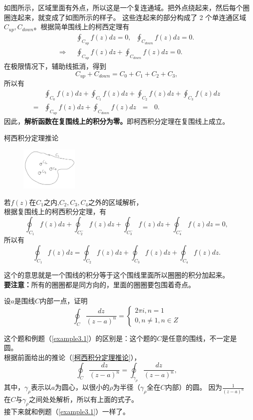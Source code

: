 \documentclass[cn,hazy,blue,14pt,normal]{elegantnote}
\numberwithin{equation}{section}
\begin{document}
如图所示，区域里面有外点，所以这是一个复连通域。把外点绕起来，然后每个圈圈连起来，就变成了如图所示的样子。
这些连起来的部分构成了 2 个单连通区域 $C_{up}, C_{down}$。根据简单围线上的柯西定理有
\begin{align*}
&\oint_{C_{up}} f(z) dz = 0, ~~~ \oint_{C_{down}} f(z) dz = 0. 
\\\Rightarrow ~~~ &\oint_{C_{up}} f(z) dz + \oint_{C_{down}} f(z) dz = 0.
\end{align*}
在极限情况下，辅助线抵消，得到
$$
C_{up} + C_{down} = C_0 + C_1 + C_2 + C_3,
$$
所以有
\begin{align*}
&\oint_{C_0} f(z) dz + \oint_{C_1} f(z) dz + \oint_{C_2} f(z)dz + \oint_{C_3} f(z) dz \\
=&\oint_{C_{up}} f(z) dz + \oint_{C_{down}} f(z) dz ~~~=~~~  0.
\end{align*}
因此，\textbf{解析函数在复围线上的积分为零。}即柯西积分定理在复围线上成立。

\begin{theorem}\label{柯西积分定理推论}
	柯西积分定理推论
\end{theorem}

\begin{figure}
	\begin{center}
		\includegraphics[width=0.25\textwidth]{./image/柯西积分定理推论.png}
	\end{center}
\end{figure}
若$f(z)$在$C_1$之内,$C_2,C_3,C_4$之外的区域解析，\\
根据复围线上的柯西积分定理，有
$$
\oint_{C_1} f(z) dz + \oint_{C^-_2} f(z) dz + \oint_{C^-_3} f(z) dz + \oint_{C^-_4} f(z) dz = 0,
$$
所以有
$$
\oint_{C_1}f(z) dz = \oint_{C_2}f(z)dz + \oint_{C_3}f(z) dz + \oint_{C_4} f(z) dz.
$$
\begin{note}
	这个的意思就是一个围线的积分等于这个围线里面所以圈圈的积分加起来。\\
	\textbf{要注意：}所有的圈圈都是同方向的，里面的圈圈要包围着奇点。
\end{note}

\begin{example}
	设$a$是围线$C$内部一点，证明
	$$
	\oint_C \frac{dz}{(z-a)^n} = \left\{
	\begin{aligned}
	2 \pi i, n=1 \\
	0, n \neq 1, n\in Z
	\end{aligned}
	\right.
	$$
\end{example}
这个题和例题（\ref{example3.1}）的区别是：这个题的$C$是任意的围线，不一定是圆。\\
根据前面给出的推论（\ref{柯西积分定理推论}），
$$
\oint_C \frac{dz}{(z-a)^n} = \oint_{\gamma_\rho} \frac{dz}{(z-a)^n},
$$
其中，$\gamma_\rho$表示以$a$为圆心，以很小的$\rho$为半径（$\gamma_\rho$全在$C$内部）的圆。
因为$\frac{1}{(z-a)^n}$在$C$与$\gamma_\rho$之间处处解析，所以有上面的式子。\\
接下来就和例题（\ref{example3.1}）一样了。
\end{document}
